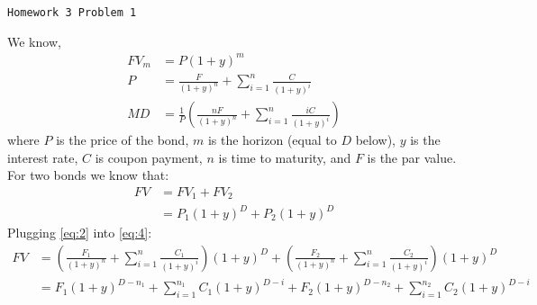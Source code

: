 \documentclass[12pt]{article}
\newcommand\Tstrut{\rule{0pt}{2.6ex}}         %
\newcommand\Bstrut{\rule[-0.9ex]{0pt}{0pt}}   %
\begin{document}
	\begin{center}
        \Tstrut \Large{\texttt{Homework 3 Problem 1}} \Bstrut \vspace*{0.8mm}  
	\end{center}
    We know,
    \begin{align}
        FV_m &= P (1 + y)^m \label{eq:1}\\
        P &= \frac{F}{(1+y)^n} + \sum_{i=1}^{n} \frac{C}{(1+y)^i}\label{eq:2} \\
        MD &= \frac{1}{P} \left( \frac{nF}{(1+y)^n}+ \sum_{i=1}^{n} \frac{iC}{(1+y)^i}\right)\label{eq:3}
    \end{align}
    where $P$ is the price of the bond, $m$ is the horizon (equal to $D$ below), $y$ is the interest rate, $C$ is coupon payment, $n$ is time to maturity, and $F$ is the par value. \\
    For two bonds we know that:
    \begin{align}
        FV &= FV_1 + FV_2 \nonumber \\
           &= P_1 (1+y)^D + P_2 (1+y)^D \label{eq:4}
    \end{align}
    Plugging \eqref{eq:2} into \eqref{eq:4}:
    \begin{align*}
        FV &= \left(\frac{F_1}{(1+y)^n} + \sum_{i=1}^{n} \frac{C_1}{(1+y)^i}\right) (1+y)^D + \left(\frac{F_2}{(1+y)^n} + \sum_{i=1}^{n} \frac{C_2}{(1+y)^i}\right) (1+y)^D \\
           &= F_1(1+y)^{D-n_1} + \sum_{i=1}^{n_1} C_1(1+y)^{D-i} + F_2(1+y)^{D-n_2} + \sum_{i=1}^{n_2} C_2(1+y)^{D-i}
    \end{align*}
\end{document}
